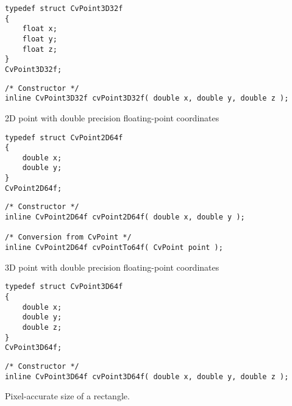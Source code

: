 \begin{lstlisting}
typedef struct CvPoint3D32f
{
    float x; 
    float y; 
    float z; 
}
CvPoint3D32f;
\end{lstlisting}

\begin{description}
\end{description}

\begin{lstlisting}
/* Constructor */
inline CvPoint3D32f cvPoint3D32f( double x, double y, double z );
\end{lstlisting}

\label{CvPoint2D64f}
2D point with double precision floating-point coordinates

\begin{lstlisting}
typedef struct CvPoint2D64f
{
    double x; 
    double y; 
}
CvPoint2D64f;
\end{lstlisting}

\begin{description}
\end{description}

\begin{lstlisting}
/* Constructor */
inline CvPoint2D64f cvPoint2D64f( double x, double y );

/* Conversion from CvPoint */
inline CvPoint2D64f cvPointTo64f( CvPoint point );
\end{lstlisting}

\label{CvPoint3D64f}
3D point with double precision floating-point coordinates

\begin{lstlisting}
typedef struct CvPoint3D64f
{
    double x; 
    double y; 
    double z; 
}
CvPoint3D64f;
\end{lstlisting}

\begin{description}
\end{description}

\begin{lstlisting}
/* Constructor */
inline CvPoint3D64f cvPoint3D64f( double x, double y, double z );
\end{lstlisting}

\label{CvSize}
Pixel-accurate size of a rectangle.

